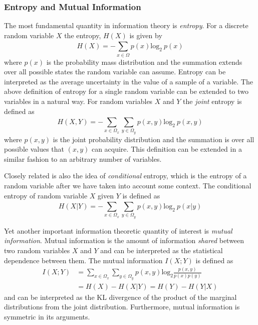 \documentclass[12pt]{article}
\begin{document}
\subsubsection{Entropy and Mutual Information}
The most fundamental quantity in information theory is \textit{entropy}. For a discrete random variable $X$ the entropy, $H(X)$ is given by
\begin{equation*}
H(X) = -\sum_{x \in \Omega}^{} p(x)\text{log}_{2}~p(x)
\end{equation*}
where $p(x)$ is the probability mass distribution and the summation extends over all possible states the random variable can assume. Entropy can be interpreted as the average uncertainty in the value of a sample of a variable. 
The above definition of entropy for a single random variable can be extended to two variables in a natural way. For random variables $X$ and $Y$ the \textit{joint} entropy is defined as 
\begin{equation*}
H(X, Y) = -\sum_{x \in \Omega_x}^{}\sum_{y \in \Omega_y}^{}p(x,y)\text{log}_2~p(x,y)
\end{equation*}
where $p(x,y)$ is the joint probability distribution and the summation is over all possible values that $(x,y)$ can acquire. This definition can be extended in a similar fashion to an arbitrary number of variables. 

Closely related is also the idea of \textit{conditional} entropy, which is the entropy of a random variable after we have taken into account some context. The conditional entropy of random variable $X$ given $Y$ is defined as 
\begin{equation*}
H(X|Y) = -\sum_{x \in \Omega_x}^{}\sum_{y \in \Omega_y}^{}p(x, y)\text{log}_2~p(x|y)
\end{equation*}

Yet another important information theoretic quantity of interest is \textit{mutual information}. Mutual information is the amount of information \textit{shared} between two random variables $X$ and $Y$ and can be interpreted as the statistical dependence between them. The mutual information $I(X;Y)$ is defined as 
\begin{align*}
I(X;Y) &= \sum_{x \in \Omega_x}^{}\sum_{y \in \Omega_y}^{}p(x,y)\text{log}_2\frac{p(x,y)}{p(x)p(y)} \\
&=  H(X) - H(X|Y) = H(Y) - H(Y|X)
\end{align*}
and can be interpreted as the KL divergence of the product of the marginal distributions from the joint distribution. Furthermore, mutual information is symmetric in its arguments. 
\end{document}
